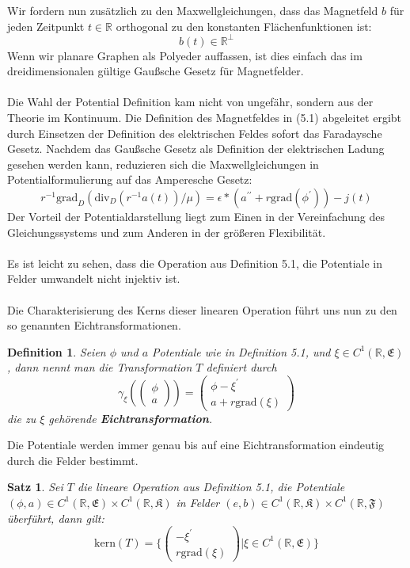 \documentclass[11pt,a4paper,leqno]{report}
\newtheorem{proposition}{Satz}[chapter]
\newtheorem{definition}[theorem]{Definition}
\numberwithin{equation}{chapter}
\begin{document}
Wir fordern nun zus\"atzlich zu den Maxwellgleichungen, dass das Magnetfeld $b$
f\"ur jeden Zeitpunkt $t\in\mathbb{R}$ orthogonal zu den konstanten Fl\"achenfunktionen ist: 
$$b(t)\in \mathbb{R}^\perp$$
Wenn wir planare Graphen als Polyeder auffassen, ist dies einfach das im dreidimensionalen g\"ultige Gau\ss{}sche Gesetz f\"ur Magnetfelder.\\
\\
Die Wahl der Potential Definition kam nicht von ungef\"ahr, sondern aus der Theorie im Kontinuum. 
Die Definition des Magnetfeldes in (5.1) abgeleitet ergibt durch Einsetzen der Definition des elektrischen Feldes sofort das Faradaysche Gesetz. 
Nachdem das Gaußsche Gesetz als Definition der elektrischen Ladung gesehen werden kann, reduzieren sich die Maxwellgleichungen in Potentialformulierung auf das Amperesche Gesetz: 
\begin{equation}
r^{-1}\text{grad}_D(\text{div}_D(r^{-1}a(t)) / \mu) = \epsilon * (a^{\prime\prime} + r\text{grad}(\phi^\prime)) - j(t)
\end{equation}
Der Vorteil der Potentialdarstellung liegt zum Einen in der Vereinfachung des Gleichungssystems und zum Anderen in der gr\"o\ss{}eren Flexibilit\"at.\\
\\
Es ist leicht zu sehen, dass die Operation aus Definition 5.1, die Potentiale in Felder umwandelt nicht injektiv ist.\\
\\
Die Charakterisierung des Kerns dieser linearen Operation f\"uhrt uns nun zu den so genannten Eichtransformationen.
\begin{definition}
	Seien $\phi$ und $a$ Potentiale wie in Definition 5.1, und $\xi\in C^1(\mathbb{R}, \mathfrak{E})$, dann nennt man die Transformation $T$ definiert durch
\begin{equation}
\gamma_\xi(\left(
\begin{array}{c}\phi\\
a
\end{array}\right))=
\left(
\begin{array}{c}\phi - \xi^\prime\\
a + r\text{grad}(\xi) 
\end{array}\right)
\end{equation}
	die zu $\xi$ geh\"orende \textbf{Eichtransformation}.
\end{definition}
\noindent
Die Potentiale werden immer genau bis auf eine Eichtransformation eindeutig durch die Felder bestimmt.
\begin{proposition}
	Sei $T$ die lineare Operation aus Definition 5.1, die Potentiale $(\phi, a)\in C^1(\mathbb{R},\mathfrak{E})\times C^1(\mathbb{R},\mathfrak{K})$ in Felder $(e, b)\in C^1(\mathbb{R},\mathfrak{K})\times C^1(\mathbb{R},\mathfrak{F})$ \"uberf\"uhrt, dann gilt:
	\begin{equation}
	\text{kern}(T)=\{\left(
	\begin{array}{c}-\xi^\prime\\
	r\text{grad}(\xi)
	\end{array}\right)| \xi\in C^1(\mathbb{R},\mathfrak{E})\}
	\end{equation}
\end{proposition}
\end{document}
